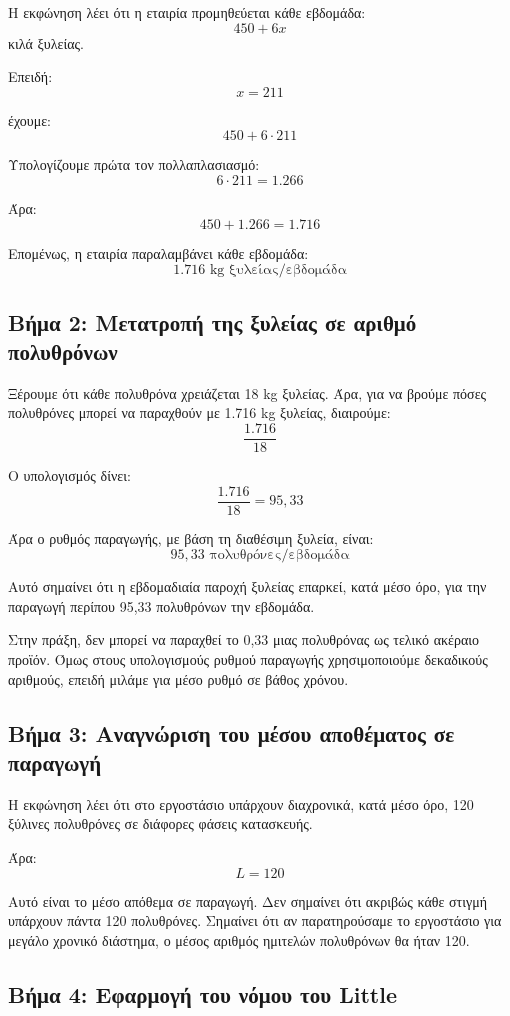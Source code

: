 \documentclass[12pt,a4paper]{article}
\begin{document}
Η εκφώνηση λέει ότι η εταιρία προμηθεύεται κάθε εβδομάδα:
\[
450+6x
\]
κιλά ξυλείας.

Επειδή:
\[
x=211
\]

έχουμε:
\[
450+6\cdot211
\]

Υπολογίζουμε πρώτα τον πολλαπλασιασμό:
\[
6\cdot211=1.266
\]

Άρα:
\[
450+1.266=1.716
\]

Επομένως, η εταιρία παραλαμβάνει κάθε εβδομάδα:
\[
\boxed{1.716 \text{ kg ξυλείας/εβδομάδα}}
\]

\subsection{Βήμα 2: Μετατροπή της ξυλείας σε αριθμό πολυθρόνων}

Ξέρουμε ότι κάθε πολυθρόνα χρειάζεται 18 kg ξυλείας. Άρα, για να βρούμε πόσες πολυθρόνες μπορεί να παραχθούν με 1.716 kg ξυλείας, διαιρούμε:
\[
\frac{1.716}{18}
\]

Ο υπολογισμός δίνει:
\[
\frac{1.716}{18}=95{,}33
\]

Άρα ο ρυθμός παραγωγής, με βάση τη διαθέσιμη ξυλεία, είναι:
\[
\boxed{95{,}33 \text{ πολυθρόνες/εβδομάδα}}
\]

Αυτό σημαίνει ότι η εβδομαδιαία παροχή ξυλείας επαρκεί, κατά μέσο όρο, για την παραγωγή περίπου 95,33 πολυθρόνων την εβδομάδα.

Στην πράξη, δεν μπορεί να παραχθεί το 0,33 μιας πολυθρόνας ως τελικό ακέραιο προϊόν. Όμως στους υπολογισμούς ρυθμού παραγωγής χρησιμοποιούμε δεκαδικούς αριθμούς, επειδή μιλάμε για μέσο ρυθμό σε βάθος χρόνου.

\subsection{Βήμα 3: Αναγνώριση του μέσου αποθέματος σε παραγωγή}

Η εκφώνηση λέει ότι στο εργοστάσιο υπάρχουν διαχρονικά, κατά μέσο όρο, 120 ξύλινες πολυθρόνες σε διάφορες φάσεις κατασκευής.

Άρα:
\[
L=120
\]

Αυτό είναι το μέσο απόθεμα σε παραγωγή. Δεν σημαίνει ότι ακριβώς κάθε στιγμή υπάρχουν πάντα 120 πολυθρόνες. Σημαίνει ότι αν παρατηρούσαμε το εργοστάσιο για μεγάλο χρονικό διάστημα, ο μέσος αριθμός ημιτελών πολυθρόνων θα ήταν 120.

\subsection{Βήμα 4: Εφαρμογή του νόμου του Little}
\end{document}
